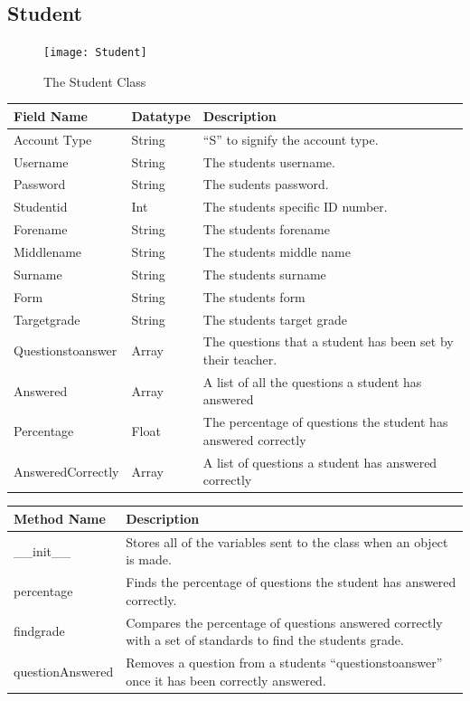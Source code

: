 \documentclass[a4paper,12pt]{report}
\begin{document}
\subsection{Student}
\FloatBarrier
\begin{figure}
\centering
\texttt{[image: Student]}
\caption{The Student Class}
\label{fig:StudentClass}
\end{figure}
\FloatBarrier
\begin{center}
\tablefirsthead{}
\tablehead{}
\tabletail{}
\tablelasttail{}
\begin{supertabular}{|m{1.8in}|m{1.22956in}|m{2.42956in}|}
\hline
Field Name &
Datatype &
Description\\\hline
Account Type &
String &
{}``S'' to signify the account type.\\\hline
Username &
String &
The students username.\\\hline
Password &
String &
The sudents password.\\\hline
Studentid &
Int &
The students specific ID number.\\\hline
Forename &
String &
The students forename\\\hline
Middlename &
String &
The students middle name\\\hline
Surname &
String &
The students surname \\\hline
Form &
String &
The students form \\\hline
Targetgrade &
String &
The students target grade\\\hline
Questionstoanswer &
Array &
The questions that a student has been set by their teacher.\\\hline
Answered &
Array &
A list of all the questions a student has answered\\\hline
Percentage &
Float &
The percentage of questions the student has answered correctly\\\hline
AnsweredCorrectly &
Array &
A list of questions a student has answered correctly\\\hline
\end{supertabular}
\end{center}

\begin{center}
\tablefirsthead{}
\tablehead{}
\tabletail{}
\tablelasttail{}
\begin{supertabular}{|m{2.72956in}|m{2.72956in}|}
\hline
Method Name &
Description\\\hline
\_\_init\_\_ &
Stores all of the variables sent to the class when an object is made.\\\hline
percentage &
Finds the percentage of questions the student has answered correctly.\\\hline
findgrade &
Compares the percentage of questions answered correctly with a set of standards to find the students grade.\\\hline
questionAnswered &
Removes a question from a students ``questionstoanswer'' once it has been correctly answered.\\\hline
\end{supertabular}
\end{center}
\end{document}
